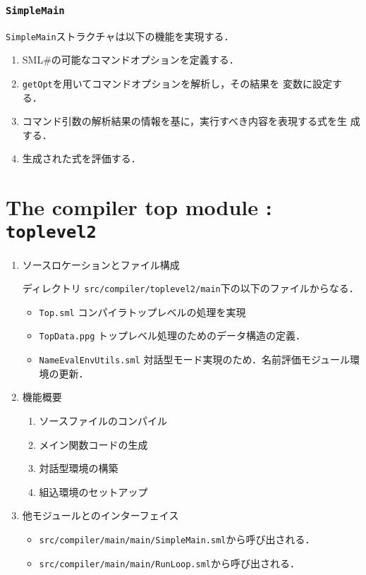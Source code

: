 \documentclass{jbook}
\newcommand{\txt}[2]{#2}
\newcommand{\smlsharp}{SML\#}
\newcommand{\code}[1]{\mbox{\large\tt #1}}
\begin{document}
\subsection{\code{SimpleMain}}
	\code{SimpleMain}ストラクチャは以下の機能を実現する．
\begin{enumerate}
\item \smlsharp{}の可能なコマンドオプションを定義する．
\item \code{getOpt}を用いてコマンドオプションを解析し，その結果を
変数に設定する．
\item コマンド引数の解析結果の情報を基に，実行すべき内容を表現する式を生
成する．
\item 生成された式を評価する．
\end{enumerate}

\fi%

\chapter{\txt
{コンパイラトップモジュール：\code{toplevel2}}
{The compiler top module : \code{toplevel2}}
}
\label{chap:TopLevel}

\ifjp%
\begin{enumerate}
\item ソースロケーションとファイル構成

ディレクトリ \code{src/compiler/toplevel2/main}下の以下のファイルからなる．
\begin{itemize}
\item \code{Top.sml} コンパイラトップレベルの処理を実現
\item \code{TopData.ppg} トップレベル処理のためのデータ構造の定義．
\item \code{NameEvalEnvUtils.sml} 対話型モード実現のため．名前評価モジュール環境の更新．
\end{itemize}

\item 機能概要 
\begin{enumerate}
\item ソースファイルのコンパイル
\item メイン関数コードの生成
\item 対話型環境の構築
\item 組込環境のセットアップ
\end{enumerate}
\item 他モジュールとのインターフェイス
\begin{itemize}
\item \code{src/compiler/main/main/SimpleMain.sml}から呼び出される．
\item \code{src/compiler/main/main/RunLoop.sml}から呼び出される．
\end{itemize}
\end{enumerate}
\else%
\fi%
\end{document}
